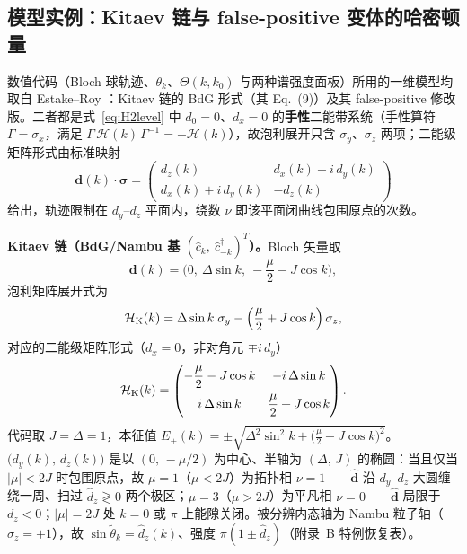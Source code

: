 \documentclass[onecolumn,aps,prl,superscriptaddress,longbibliography]{revtex4-2}
\begin{document}
\subsection{模型实例：Kitaev 链与 false-positive 变体的哈密顿量}\label{sec:models}

数值代码（Bloch 球轨迹、$\theta_k$、$\Theta(k,k_0)$ 与两种谱强度面板）所用的一维模型均取自 Estake--Roy \cite{estakeRoy2025}：Kitaev 链的 BdG 形式（其 Eq.~(9)）及其 false-positive 修改版。二者都是式~\eqref{eq:H2level} 中 $d_0 = 0$、$d_x = 0$ 的\textbf{手性}二能带系统（手性算符 $\Gamma = \sigma_x$，满足 $\Gamma\,\mathcal{H}(k)\,\Gamma^{-1} = -\mathcal{H}(k)$），故泡利展开只含 $\sigma_y$、$\sigma_z$ 两项；二能级矩阵形式由标准映射
\begin{equation}\label{eq:matrix_form}
\mathbf{d}(k)\cdot\symbf{\sigma} = \begin{pmatrix} d_z(k) & d_x(k) - i\,d_y(k)\\ d_x(k) + i\,d_y(k) & -d_z(k) \end{pmatrix}
\end{equation}
给出，轨迹限制在 $d_y$--$d_z$ 平面内，绕数 $\nu$ 即该平面闭曲线包围原点的次数。

\textbf{Kitaev 链（BdG/Nambu 基 $(\hat{c}_k,\ \hat{c}^\dagger_{-k})^T$）。}Bloch 矢量取
\begin{equation}\label{eq:kitaev_d}
\mathbf{d}(k) = \Big(0,\ \Delta\sin k,\ -\frac{\mu}{2} - J\cos k\Big),
\end{equation}
泡利矩阵展开式为
\begin{equation}\label{eq:kitaev_pauli}
\mathcal{H}_{\rm K}(k) = \Delta\sin k\;\sigma_y - \Big(\frac{\mu}{2} + J\cos k\Big)\,\sigma_z,
\end{equation}
对应的二能级矩阵形式（$d_x = 0$，非对角元 $\mp i\,d_y$）
\begin{equation}\label{eq:kitaev_matrix}
\mathcal{H}_{\rm K}(k) =
\begin{pmatrix}
-\dfrac{\mu}{2} - J\cos k & -i\,\Delta\sin k\\[8pt]
i\,\Delta\sin k & \dfrac{\mu}{2} + J\cos k
\end{pmatrix}.
\end{equation}
代码取 $J = \Delta = 1$，本征值 $E_\pm(k) = \pm\sqrt{\Delta^2\sin^2 k + \big(\frac{\mu}{2} + J\cos k\big)^2}$。$\big(d_y(k),\,d_z(k)\big)$ 是以 $(0,\,-\mu/2)$ 为中心、半轴为 $(\Delta,\,J)$ 的椭圆：当且仅当 $|\mu| < 2J$ 时包围原点，故 $\mu = 1$（$\mu < 2J$）为拓扑相 $\nu = 1$——$\hat{\mathbf{d}}$ 沿 $d_y$--$d_z$ 大圆缠绕一周、扫过 $\hat d_z \gtrless 0$ 两个极区；$\mu = 3$（$\mu > 2J$）为平凡相 $\nu = 0$——$\hat{\mathbf{d}}$ 局限于 $d_z < 0$；$|\mu| = 2J$ 处 $k = 0$ 或 $\pi$ 上能隙关闭。被分辨内态轴为 Nambu 粒子轴（$\sigma_z = +1$），故 $\sin\tilde\theta_k = \hat d_z(k)$、强度 $\pi(1\pm\hat d_z)$（附录~B 特例恢复表）。
\end{document}
